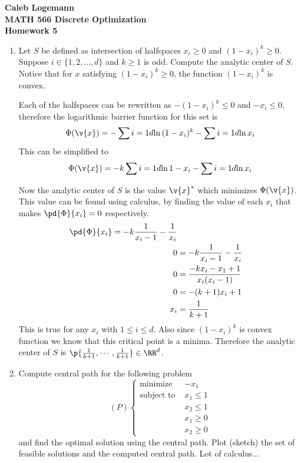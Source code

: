 \documentclass[11pt, oneside]{article}
\begin{document}
\noindent \textbf{\Large{Caleb Logemann \\
MATH 566 Discrete Optimization\\
Homework 5
}}

%
\begin{enumerate}
  \item %
    Let $S$ be defined as intersection of halfspaces $x_i \geq 0$ and $(1-x_i)^k \geq 0$.
    Suppose $i \in \{1,2,\ldots,d\}$ and $k \geq 1$ is odd.
    Compute the analytic center of $S$.
    Notice that for $x$ satisfying $(1-x_i)^k \geq 0$, the function $(1-x_i)^k$ is convex.

    Each of the halfspaces can be rewritten as $-(1 - x_i)^k \le 0$ and
    $-x_i \le 0$, therefore the logarithmic barrier function for this set is
    \[
      \Phi(\v{x}) = -\sum{i = 1}{d}{\ln{(1 - x_i)^k}} - \sum{i=1}{d}{\ln{x_i}}
    \]
    This can be simplified to
    \[
      \Phi(\v{x}) = -k\sum{i = 1}{d}{\ln{1 - x_i}} - \sum{i=1}{d}{\ln{x_i}}
    \]

    Now the analytic center of $S$ is the value $\v{x}^*$ which minimizes $\Phi(\v{x})$.
    This value can be found using calculus, by finding the value of each $x_i$
    that makes $\pd{\Phi}{x_i} = 0$ respectively.
    \begin{align*}
      \pd{\Phi}{x_i} = -k\frac{1}{x_i - 1} - \frac{1}{x_i} \\
      0 &= -k\frac{1}{x_i - 1} - \frac{1}{x_i} \\
      0 &= \frac{-k x_i - x_1 + 1}{x_i(x_i - 1)} \\
      0 &= -(k+1)x_i + 1 \\
      x_i &= \frac{1}{k+1} \\
    \end{align*}
    This is true for any $x_i$ with $1 \le i \le d$.
    Also since $(1 - x_i)^k$ is convex function we know that this critical point
    is a minima.
    Therefore the analytic center of $S$ is
    $\p{\frac{1}{k+1}, \cdots, \frac{1}{k+1}} \in \RR^d$.

  \item %
    Compute central path for the following problem
    \[
      (P)
      \begin{cases} 
        \text{minimize }   & -x_1 \\
        \text{subject to } & x_1 \leq 1 \\
                           & x_2 \leq 1 \\
                           & x_1 \geq 0 \\
                           & x_2 \geq 0
      \end{cases}
    \]
    and find the optimal solution using the central path.
    Plot (sketch) the set of feasible solutions and the computed central path.
    Lot of calculus...


\end{enumerate}
\end{document}
